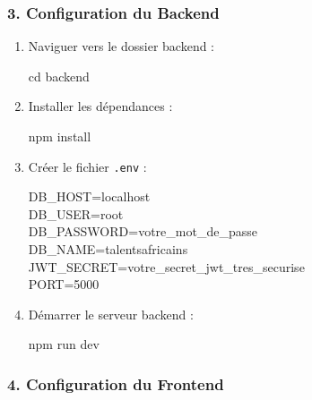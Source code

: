 \documentclass[12pt,a4paper]{article}
\begin{document}
\subsubsection{3. Configuration du Backend}

\begin{enumerate}[leftmargin=*]
    \item Naviguer vers le dossier backend :
    \begin{tcolorbox}[colback=darkcolor!5, colframe=darkcolor, fonttitle=\ttfamily]
    cd backend
    \end{tcolorbox}
    
    \item Installer les dépendances :
    \begin{tcolorbox}[colback=darkcolor!5, colframe=darkcolor, fonttitle=\ttfamily]
    npm install
    \end{tcolorbox}
    
    \item Créer le fichier \texttt{.env} :
    \begin{tcolorbox}[colback=darkcolor!5, colframe=darkcolor, fonttitle=\ttfamily, fontsize=\small]
    DB\_HOST=localhost\\
    DB\_USER=root\\
    DB\_PASSWORD=votre\_mot\_de\_passe\\
    DB\_NAME=talentsafricains\\
    JWT\_SECRET=votre\_secret\_jwt\_tres\_securise\\
    PORT=5000
    \end{tcolorbox}
    
    \item Démarrer le serveur backend :
    \begin{tcolorbox}[colback=darkcolor!5, colframe=darkcolor, fonttitle=\ttfamily]
    npm run dev
    \end{tcolorbox}
\end{enumerate}

\subsubsection{4. Configuration du Frontend}
\end{document}
